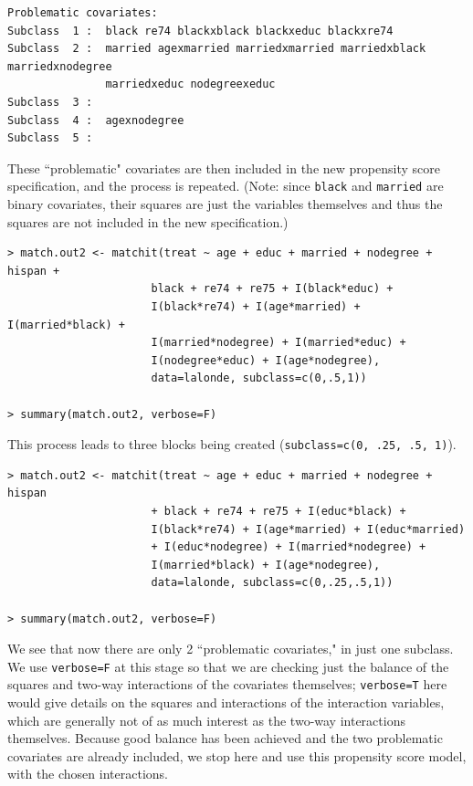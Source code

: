 \documentclass[oneside,letterpaper,titlepage]{article}
\begin{document}
\begin{verbatim}
Problematic covariates:
Subclass  1 :  black re74 blackxblack blackxeduc blackxre74
Subclass  2 :  married agexmarried marriedxmarried marriedxblack marriedxnodegree 
               marriedxeduc nodegreexeduc
Subclass  3 :  
Subclass  4 :  agexnodegree
Subclass  5 :  
\end{verbatim}

These ``problematic" covariates are then included in the new
propensity score specification, and the process is repeated.  (Note:
since {\tt black} and {\tt married} are binary covariates, their
squares are just the variables themselves and thus the squares are not
included in the new specification.)

\begin{verbatim}
> match.out2 <- matchit(treat ~ age + educ + married + nodegree + hispan +
                      black + re74 + re75 + I(black*educ) +
                      I(black*re74) + I(age*married) + I(married*black) + 
                      I(married*nodegree) + I(married*educ) +
                      I(nodegree*educ) + I(age*nodegree),
                      data=lalonde, subclass=c(0,.5,1))

> summary(match.out2, verbose=F)
\end{verbatim}

This process leads to three blocks being created  ({\tt subclass=c(0, .25, .5, 1)}).

\begin{verbatim}
> match.out2 <- matchit(treat ~ age + educ + married + nodegree + hispan
                      + black + re74 + re75 + I(educ*black) +
                      I(black*re74) + I(age*married) + I(educ*married)
                      + I(educ*nodegree) + I(married*nodegree) +
                      I(married*black) + I(age*nodegree),
                      data=lalonde, subclass=c(0,.25,.5,1))

> summary(match.out2, verbose=F)
\end{verbatim}

We see that now there are only 2 ``problematic covariates," in just
one subclass.  We use {\tt verbose=F} at this stage so that
we are checking just the balance of the squares and two-way
interactions of the covariates themselves; {\tt verbose=T} here would
give details on the squares and interactions of the interaction
variables, which are generally not of as much interest as the two-way
interactions themselves.  Because good balance has been achieved and the two problematic covariates
are already included, we stop here and use this propensity
score model, with the chosen interactions.
\end{document}
